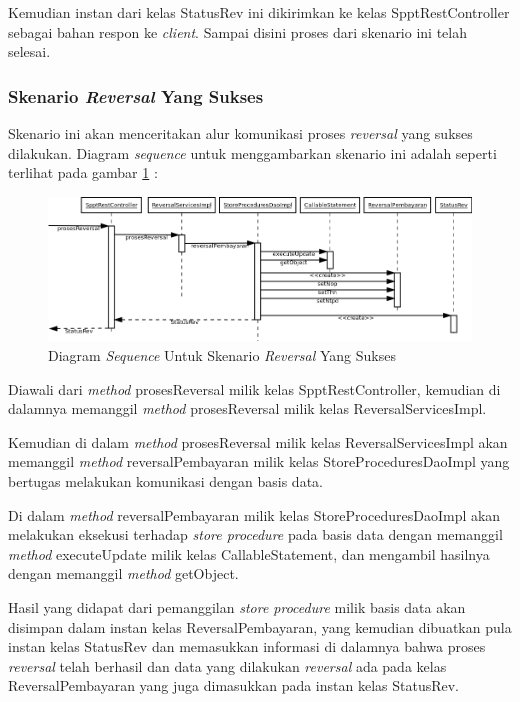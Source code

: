\documentclass[pdftex,12pt, oneside]{article}
\begin{document}
Kemudian instan dari kelas StatusRev ini dikirimkan ke kelas SpptRestController sebagai bahan respon ke \textit{client}. Sampai disini proses dari skenario ini telah selesai.

\subsubsection{Skenario \textit{Reversal} Yang Sukses}

Skenario ini akan menceritakan alur komunikasi proses \textit{reversal} yang sukses dilakukan. Diagram \textit{sequence} untuk menggambarkan skenario ini adalah seperti terlihat pada gambar \ref{fig:uml-seq-rev} :

\begin{figure}[H]
  \centering
  \includegraphics[width=1\textwidth]{./resources/diagram/uml-seq-rev}
  \caption{Diagram \textit{Sequence} Untuk Skenario \textit{Reversal} Yang Sukses}
  \label{fig:uml-seq-rev}
\end{figure}

Diawali dari \textit{method} prosesReversal milik kelas SpptRestController, kemudian di dalamnya memanggil \textit{method} prosesReversal milik kelas ReversalServicesImpl. 

Kemudian di dalam \textit{method} prosesReversal milik kelas ReversalServicesImpl akan memanggil \textit{method} reversalPembayaran milik kelas StoreProceduresDaoImpl yang bertugas melakukan komunikasi dengan basis data.

Di dalam \textit{method} reversalPembayaran milik kelas StoreProceduresDaoImpl akan melakukan eksekusi terhadap \textit{store procedure} pada basis data dengan memanggil \textit{method} executeUpdate milik kelas CallableStatement, dan mengambil hasilnya dengan memanggil \textit{method} getObject.

Hasil yang didapat dari pemanggilan \textit{store procedure} milik basis data akan disimpan dalam instan kelas ReversalPembayaran, yang kemudian dibuatkan pula instan kelas StatusRev dan memasukkan informasi di dalamnya bahwa proses \textit{reversal} telah berhasil dan data yang dilakukan \textit{reversal} ada pada kelas ReversalPembayaran yang juga dimasukkan pada instan kelas StatusRev. 
\end{document}
